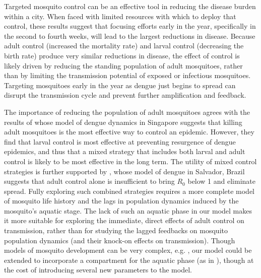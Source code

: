 \documentclass[10pt,letterpaper]{article}
\begin{document}
Targeted mosquito control can be an effective tool in reducing the disease burden within a city.
When faced with limited resources with which to deploy that control, these results suggest that focusing efforts early in the year, specifically in the second to fourth weeks, will lead to the largest reductions in disease.
Because adult control (increased the mortality rate) and larval control (decreasing the birth rate) produce very similar reductions in disease, the effect of control is likely driven by reducing the standing population of adult mosquitoes, rather than by limiting the transmission potential of exposed or infectious mosquitoes.
Targeting mosquitoes early in the year as dengue just begins to spread can disrupt the transmission cycle and prevent further amplification and feedback.

The importance of reducing the population of adult mosquitoes agrees with the results of \cite{Burattini2008} whose model of dengue dynamics in Singapore suggests that killing adult mosquitoes is the most effective way to control an epidemic.
However, they find that larval control is most effective at preventing resurgence of dengue epidemics, and thus that a mixed strategy that includes both larval and adult control is likely to be most effective in the long term.
The utility of mixed control strategies is further supported by \cite{Pinho2010}, whose model of dengue in Salvador, Brazil suggests that adult control alone is insufficient to bring $R_0$ below 1 and eliminate spread.
Fully exploring such combined strategies requires a more complete model of mosquito life history and the lags in population dynamics induced by the mosquito's aquatic stage.
The lack of such an aquatic phase in our model makes it more suitable for exploring the immediate, direct effects of adult control on transmission, rather than for studying the lagged feedbacks on mosquito population dynamics (and their knock-on effects on transmission).
Though models of mosquito development can be very complex, e.g. \cite{Magori2009}, our model could be extended to incorporate a compartment for the aquatic phase (as in \cite{Burattini2008, Pinho2010}), though at the cost of introducing several new parameters to the model.
\end{document}
